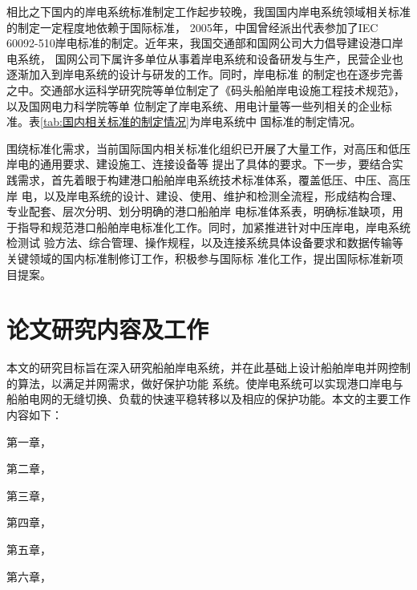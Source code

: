 \begin{table}[!htp]
	\centering
	\caption[国外相关标准的制定情况]{国外相关标准的制定情况}
	\label{tab:国外相关标准的制定情况}
\end{table}

相比之下国内的岸电系统标准制定工作起步较晚，我国国内岸电系统领域相关标准的制定一定程度地依赖于国际标准\cite{SP4}，
2005年，中国曾经派出代表参加了IEC 60092-510岸电标准的制定。近年来，我国交通部和国网公司大力倡导建设港口岸电系统，
国网公司下属许多单位从事着岸电系统和设备研发与生产，民营企业也逐渐加入到岸电系统的设计与研发的工作。同时，岸电标准
的制定也在逐步完善之中。交通部水运科学研究院等单位制定了《码头船舶岸电设施工程技术规范》，以及国网电力科学院等单
位制定了岸电系统、用电计量等一些列相关的企业标准\cite{SP14}。表\ref{tab:国内相关标准的制定情况}为岸电系统中
国标准的制定情况。

\begin{table}[!htp]
	\centering
	\caption[国内相关标准的制定情况]{国内相关标准的制定情况}
	\label{tab:国内相关标准的制定情况}
\end{table}

围绕标准化需求，当前国际国内相关标准化组织已开展了大量工作，对高压和低压岸电的通用要求、建设施工、连接设备等
提出了具体的要求。下一步，要结合实践需求，首先着眼于构建港口船舶岸电系统技术标准体系，覆盖低压、中压、高压岸
电，以及岸电系统的设计、建设、使用、维护和检测全流程，形成结构合理、专业配套、层次分明、划分明确的港口船舶岸
电标准体系表，明确标准缺项，用于指导和规范港口船舶岸电标准化工作。同时，加紧推进针对中压岸电，岸电系统检测试
验方法、综合管理、操作规程，以及连接系统具体设备要求和数据传输等关键领域的国内标准制修订工作，积极参与国际标
准化工作，提出国际标准新项目提案\cite{SP18}。

\section{论文研究内容及工作}
本文的研究目标旨在深入研究船舶岸电系统，并在此基础上设计船舶岸电并网控制的算法，以满足并网需求，做好保护功能
系统。使岸电系统可以实现港口岸电与船舶电网的无缝切换、负载的快速平稳转移以及相应的保护功能。本文的主要工作内容如下：

第一章，

第二章，

第三章，

第四章，

第五章，

第六章，


